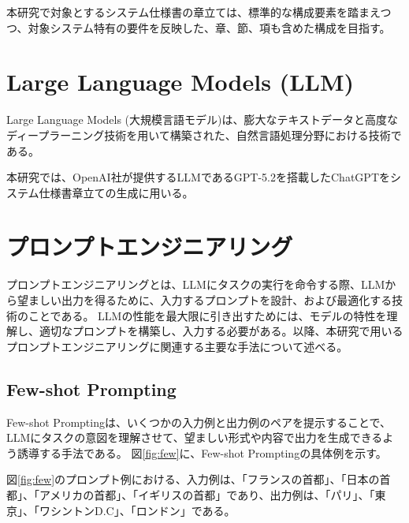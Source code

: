 

本研究で対象とするシステム仕様書の章立ては、標準的な構成要素を踏まえつつ、対象システム特有の要件を反映した、章、節、項も含めた構成を目指す。


\section{Large Language Models (LLM)}
\label{sec:llm}

Large Language Models (大規模言語モデル)\cite{whatllm}は、膨大なテキストデータと高度なディープラーニング技術を用いて構築された、自然言語処理分野における技術である。

本研究では、OpenAI\cite{openai}社が提供するLLMであるGPT-5.2\cite{gpt52}を搭載したChatGPT\cite{chatgpt}をシステム仕様書章立ての生成に用いる。

\section{プロンプトエンジニアリング}
\label{sec:prompt_engineering}

プロンプトエンジニアリングとは、LLMにタスクの実行を命令する際、LLMから望ましい出力を得るために、入力するプロンプトを設計、および最適化する技術のことである\cite{prompt_engineering}。
LLMの性能を最大限に引き出すためには、モデルの特性を理解し、適切なプロンプトを構築し、入力する必要がある。以降、本研究で用いるプロンプトエンジニアリングに関連する主要な手法について述べる。

\subsection{Few-shot Prompting}
\label{subsec:few_shot}

Few-shot Prompting\cite{fewshot}は、いくつかの入力例と出力例のペアを提示することで、LLMにタスクの意図を理解させて、望ましい形式や内容で出力を生成できるよう誘導する手法である。
図\ref{fig:few}に、Few-shot Promptingの具体例を示す。

図\ref{fig:few}のプロンプト例における、入力例は、「フランスの首都」、「日本の首都」、「アメリカの首都」、「イギリスの首都」であり、出力例は、「パリ」、「東京」、「ワシントンD.C」、「ロンドン」である。

